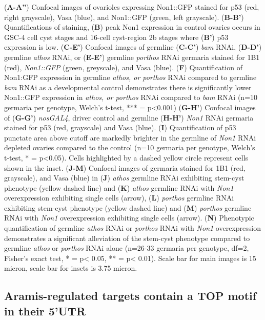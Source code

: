 \documentclass[12pt,oneside]{reedthesis}
\begin{document}
\setlength\parindent{0pt}(\textbf{A-A''}) Confocal images of ovarioles expressing Non1::GFP stained for p53 (red, right grayscale), Vasa (blue), and Non1::GFP (green, left grayscale). (\textbf{B-B'}) Quantifications of staining, (\textbf{B}) peak Non1 expression in control ovaries occurs in GSC-4 cell cyst stages and 16-cell cyst-region 2b stages where (\textbf{B'}) p53 expression is low. (\textbf{C-E'}) Confocal images of germline (\textbf{C-C'}) \emph{bam} RNAi, (\textbf{D-D'}) germline \emph{athos} RNAi, or (\textbf{E-E'}) germline \emph{porthos} RNAi germaria stained for 1B1 (red), \emph{Non1::GFP} (green, greyscale), and Vasa (blue). (\textbf{F}) Quantification of Non1:GFP expression in germline \emph{athos, or porthos} RNAi compared to germline \emph{bam} RNAi as a developmental control demonstrates there is significantly lower Non1::GFP expression in \emph{athos, or porthos} RNAi compared to \emph{bam} RNAi (n=10 germaria per genotype, Welch's t-test, *** = p\textless0.001) (\textbf{G-H'}) Confocal images of (\textbf{G-G'}) \emph{nosGAL4}, driver control and germline (\textbf{H-H'}) \emph{Non1} RNAi germaria stained for p53 (red, grayscale) and Vasa (blue). (\textbf{I}) Quantification of p53 punctate area above cutoff are markedly brighter in the germline of \emph{Non1} RNAi depleted ovaries compared to the control (n=10 germaria per genotype, Welch's t-test, * = p\textless0.05). Cells highlighted by a dashed yellow circle represent cells shown in the inset. (\textbf{J-M}) Confocal images of germaria stained for 1B1 (red, grayscale), and Vasa (blue) in (\textbf{J}) \emph{athos} germline RNAi exhibiting stem-cyst phenotype (yellow dashed line) and (\textbf{K}) \emph{athos} germline RNAi with \emph{Non1} overexpression exhibiting single cells (arrow), (\textbf{L}) \emph{porthos} germline RNAi exhibiting stem-cyst phenotype (yellow dashed line) and (\textbf{M}) \emph{porthos} germline RNAi with \emph{Non1} overexpression exhibiting single cells (arrow). (\textbf{N}) Phenotypic quantification of germline \emph{athos} RNAi or \emph{porthos} RNAi with \emph{Non1} overexpression demonstrates a significant alleviation of the stem-cyst phenotype compared to germline \emph{athos} or \emph{porthos} RNAi alone (n=26-33 germaria per genotype, df=2, Fisher's exact test, * = p\textless{} 0.05, ** = p\textless{} 0.01). Scale bar for main images is 15 micron, scale bar for insets is 3.75 micron.


\textbf{\hfill\break
}

\hypertarget{aramis-regulated-targets-contain-a-top-motif-in-their-5utr}{%
\subsection{Aramis-regulated targets contain a TOP motif in their 5'UTR}\label{aramis-regulated-targets-contain-a-top-motif-in-their-5utr}}
\end{document}
